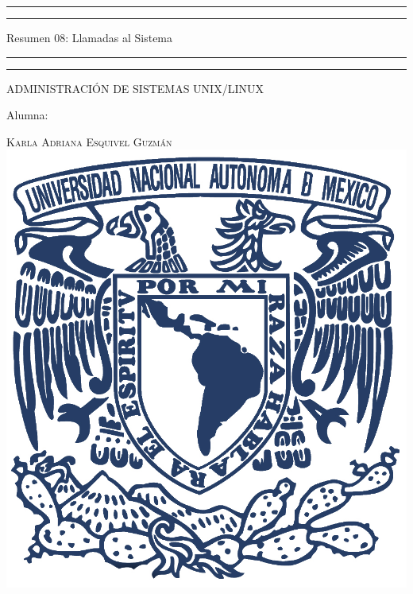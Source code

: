 \documentclass[a4paper, 11pt, oneside]{article}
\begin{document}
 

\begin{titlepage} 

	\centering 
	
	\scshape 
	
	\vspace*{\baselineskip} 
	
	
	
	\rule{\textwidth}{1.6pt}\vspace*{-\baselineskip}\vspace*{2pt} 
	\rule{\textwidth}{0.4pt} 
	
	\vspace{0.75\baselineskip} 
	
	{\LARGE Resumen 08: Llamadas al Sistema}	
	\vspace{0.75\baselineskip} 
	
	\rule{\textwidth}{0.4pt}\vspace*{-\baselineskip}\vspace{3.2pt}
	\rule{\textwidth}{1.6pt} 
	
	\vspace{2\baselineskip} 
	

	ADMINISTRACIÓN DE SISTEMAS UNIX/LINUX
	
	\vspace*{3\baselineskip} 
	
	
	
	Alumna:
	
	\vspace{0.5\baselineskip} 
	
	{\scshape\Large Karla Adriana Esquivel Guzmán \\} 
	\vspace{0.5\baselineskip} 
	\vfill
	\includegraphics{unam.jpg}
	

\end{titlepage}
\end{document}
